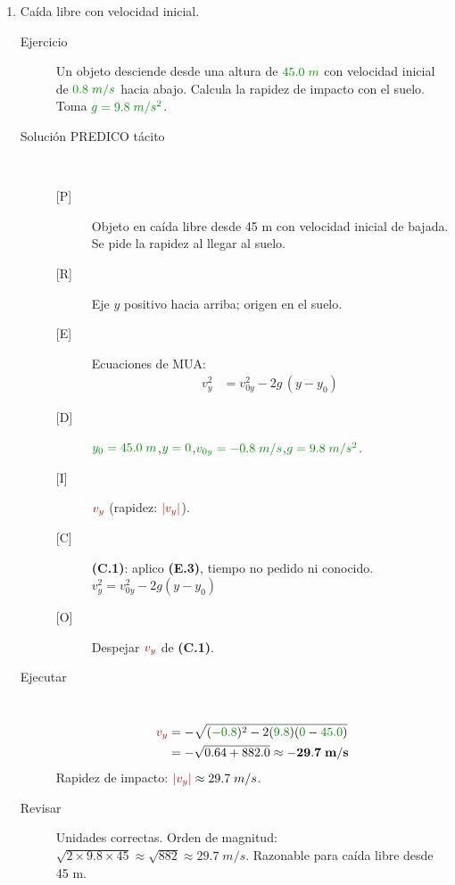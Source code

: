 \documentclass[11pt]{book}
\newcommand{\dato}[1]{\textcolor{colDatos}{#1}}
\newcommand{\incog}[1]{\textcolor{colIncog}{#1}}
\newcommand{\cond}[1]{\textcolor{colCond}{#1}}
\begin{document}
\begin{enumerate}
\item Caída libre con velocidad inicial.

\begin{description}
\item[Ejercicio] Un objeto desciende desde una altura de $\dato{45.0\;m}$ con velocidad inicial de $\dato{0.8\;m/s}$ hacia abajo. Calcula la rapidez de impacto con el suelo. Toma $\dato{g = 9.8\;m/s^2}$.

\item[Solución PREDICO tácito]~

\begin{description}
    \item[{[P]}] Objeto en caída libre desde 45 m con velocidad inicial de bajada. Se pide la rapidez al llegar al suelo.

    \item[{[R]}] Eje $y$ positivo hacia arriba; origen en el suelo.

    \item[{[E]}] Ecuaciones de MUA:
    \begin{align}
        v_y^2 &= v_{0y}^2 - 2g\,(y - y_0)  \tag{E.3}
    \end{align}

    \item[{[D]}] $\dato{y_0 = 45.0\;m}$,\quad $\dato{y = 0}$,\quad $\dato{v_{0y} = -0.8\;m/s}$,\quad $\dato{g = 9.8\;m/s^2}$.

    \item[{[I]}] $\incog{v_y}$ (rapidez: $\incog{|v_y|}$).

    \item[{[C]}] \textbf{(C.1)}: aplico \textbf{(E.3)}, tiempo no pedido ni conocido. \hfill \cond{$v_y^2 = v_{0y}^2 - 2g(y-y_0)$}

    \item[{[O]}] Despejar $\incog{v_y}$ de \textbf{(C.1)}.
\end{description}

\item[Ejecutar]~
\begin{align}
\incog{v_y} &= -\sqrt{(\dato{-0.8})^2 - 2(\dato{9.8})(\dato{0} - \dato{45.0})} \nonumber\\
            &= -\sqrt{0.64 + 882.0} \approx \mathbf{-29.7\;m/s} \nonumber
\end{align}
Rapidez de impacto: $\incog{|v_y|} \approx 29.7\;m/s$.

\item[Revisar] Unidades correctas. Orden de magnitud: $\sqrt{2 \times 9.8 \times 45} \approx \sqrt{882} \approx 29.7\;m/s$. Razonable para caída libre desde 45 m.


\end{description}
\end{enumerate}
\end{document}

